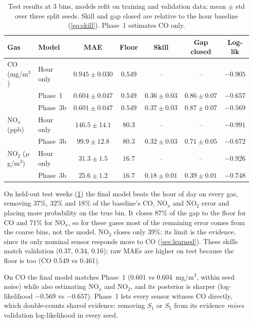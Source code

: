 \begin{table}[t]
  \centering
  \caption{Test results at 3 bins, models refit on training and validation
  data; mean $\pm$ std over three split seeds. Skill and gap closed are
  relative to the hour baseline (\cref{eq:skill}). Phase~1 estimates CO only.}
  \label{tab:test}
  \small
  \setlength{\tabcolsep}{4pt}
  \begin{tabular}{llccccc}
    \toprule
    Gas & Model & MAE & Floor & Skill & Gap closed & Log-lik \\
    \midrule
    CO (mg/m$^3$) & Hour only & $0.945 \pm 0.030$ & $0.549$ & -- & -- & $-0.905$ \\
     & Phase~1 & $0.604 \pm 0.047$ & $0.549$ & $0.36 \pm 0.03$ & $0.86 \pm 0.07$ & $-0.657$ \\
     & Phase~3b & $0.601 \pm 0.047$ & $0.549$ & $0.37 \pm 0.03$ & $0.87 \pm 0.07$ & $-0.569$ \\
    \midrule
    NO$_x$ (ppb) & Hour only & $146.5 \pm 14.1$ & $80.3$ & -- & -- & $-0.991$ \\
     & Phase~3b & $99.9 \pm 12.8$ & $80.3$ & $0.32 \pm 0.03$ & $0.71 \pm 0.05$ & $-0.672$ \\
    \midrule
    NO$_2$ ($\mu$g/m$^3$) & Hour only & $31.3 \pm 1.5$ & $16.7$ & -- & -- & $-0.926$ \\
     & Phase~3b & $25.6 \pm 1.2$ & $16.7$ & $0.18 \pm 0.01$ & $0.39 \pm 0.01$ & $-0.748$ \\
    \bottomrule
  \end{tabular}
\end{table}

On held-out test weeks (\cref{tab:test}) the final model beats the hour of day
on every gas, removing 37\%, 32\% and 18\% of the baseline's CO, NO$_x$ and
NO$_2$ error and placing more probability on the true bin. It closes 87\% of
the gap to the floor for CO and 71\% for NO$_x$, so for these gases most of the
remaining error comes from the coarse bins, not the model. NO$_2$ closes only
39\%: its limit is the evidence, since its only nominal sensor responds more to
CO (\cref{sec:learned}). These skills match validation (0.37, 0.34, 0.16);
raw MAEs are higher on test because the floor is too (CO 0.549 vs 0.461).

On CO the final model matches Phase~1 (0.601 vs 0.604~mg/m$^3$, within seed
noise) while also estimating NO$_x$ and NO$_2$, and its posterior is sharper
(log-likelihood $-0.569$ vs $-0.657$). Phase~1 lets every sensor witness CO
directly, which double-counts shared evidence: removing $S_1$ or $S_5$ from its
evidence \emph{raises} validation log-likelihood in every seed.

